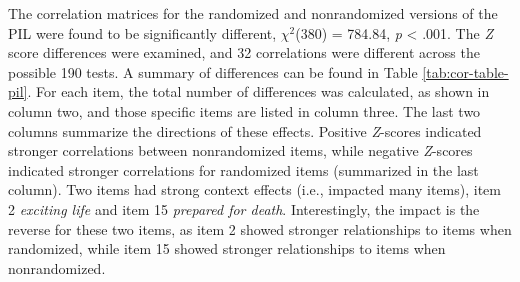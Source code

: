 \documentclass[english,man]{apa6}
\theoremstyle{definition}
\theoremstyle{definition}
\theoremstyle{definition}
\theoremstyle{remark}
\begin{document}
The correlation matrices for the randomized and nonrandomized versions
of the PIL were found to be significantly different, \(\chi^2\)(380) =
784.84, \emph{p} \textless{} .001. The \emph{Z} score differences were
examined, and 32 correlations were different across the possible 190
tests. A summary of differences can be found in Table
\ref{tab:cor-table-pil}. For each item, the total number of differences
was calculated, as shown in column two, and those specific items are
listed in column three. The last two columns summarize the directions of
these effects. Positive \emph{Z}-scores indicated stronger correlations
between nonrandomized items, while negative \emph{Z}-scores indicated
stronger correlations for randomized items (summarized in the last
column). Two items had strong context effects (i.e., impacted many
items), item 2 \emph{exciting life} and item 15 \emph{prepared for
death}. Interestingly, the impact is the reverse for these two items, as
item 2 showed stronger relationships to items when randomized, while
item 15 showed stronger relationships to items when nonrandomized.
\end{document}
